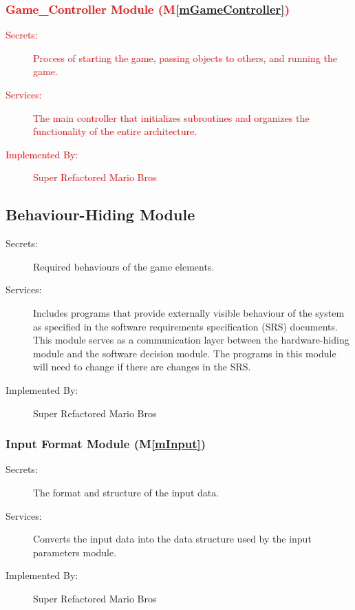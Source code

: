 \documentclass[12pt, titlepage]{article}
\newcommand{\mref}[1]{M\ref{#1}}
\begin{document}
\subsubsection{\textcolor{red}{Game\_Controller Module (\mref{mGameController})}}

\begin{description}
\item[\textcolor{red}{Secrets:}] \textcolor{red}{Process of starting the game, passing objects to others, and running the game.}
\item[\textcolor{red}{Services:}] \textcolor{red}{The main controller that initializes subroutines and organizes the functionality of the entire architecture.}
\item[\textcolor{red}{Implemented By:}] \textcolor{red}{Super Refactored Mario Bros}
\end{description}

\subsection{Behaviour-Hiding Module}

\begin{description}
\item[Secrets:] Required behaviours of the game elements.
\item[Services:]Includes programs that provide externally visible behaviour of
  the system as specified in the software requirements specification (SRS)
  documents. This module serves as a communication layer between the
  hardware-hiding module and the software decision module. The programs in this
  module will need to change if there are changes in the SRS.
\item[Implemented By:] Super Refactored Mario Bros
\end{description}

\subsubsection{Input Format Module (\mref{mInput})}

\begin{description}
\item[Secrets:]The format and structure of the input data.
\item[Services:]Converts the input data into the data structure used by the
  input parameters module.
\item[Implemented By:] Super Refactored Mario Bros
\end{description}
\end{document}
